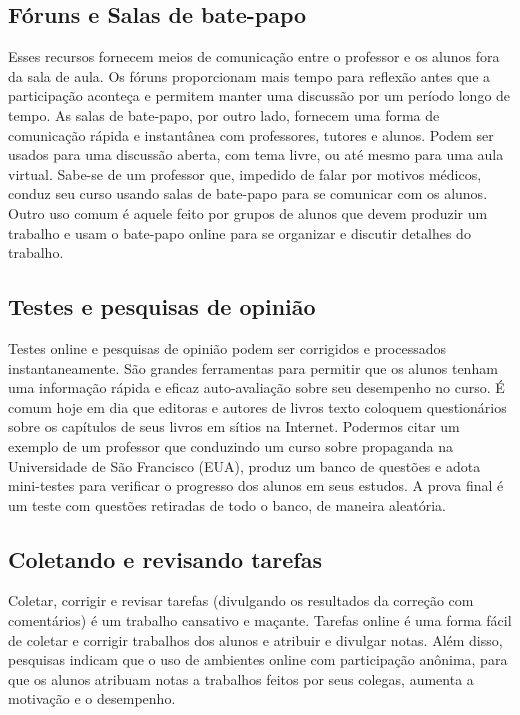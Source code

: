 \subsection{Fóruns e Salas de bate-papo}


Esses recursos fornecem meios de comunicação entre o professor e os alunos fora da sala de aula. Os fóruns proporcionam mais tempo para reflexão antes que a participação aconteça e permitem manter uma discussão por um período longo de tempo. As salas de bate-papo, por outro lado, fornecem uma forma de comunicação rápida e instantânea com professores, tutores e alunos. Podem ser usados para uma discussão aberta, com tema livre, ou até mesmo para uma aula virtual. Sabe-se de um professor que, impedido de falar por motivos médicos, conduz seu curso usando salas de bate-papo para se comunicar com os alunos. Outro uso comum é aquele feito por grupos de alunos que devem produzir um trabalho e usam o bate-papo online para se organizar e discutir detalhes do trabalho.

\subsection{Testes e pesquisas de opinião}


Testes online e pesquisas de opinião podem ser corrigidos e processados instantaneamente. São grandes ferramentas para permitir que os alunos tenham uma informação rápida e eficaz auto-avaliação sobre seu desempenho no curso. É comum hoje em dia que editoras e autores de livros texto coloquem questionários sobre os capítulos de seus livros em sítios na Internet. Podermos citar um exemplo de um professor que conduzindo um curso sobre propaganda na Universidade de São Francisco (EUA), produz um banco de questões e adota mini-testes para verificar o progresso dos alunos em seus estudos. A prova final é um teste com questões retiradas de todo o banco, de maneira aleatória.

\subsection{Coletando e revisando tarefas}


Coletar, corrigir e revisar tarefas (divulgando os resultados da correção com comentários) é um trabalho cansativo e maçante. Tarefas online é uma forma fácil de coletar e corrigir trabalhos dos alunos e atribuir e divulgar notas. Além disso, pesquisas indicam que o uso de ambientes online com participação anônima, para que os alunos atribuam notas a trabalhos feitos por seus colegas, aumenta a motivação e o desempenho.

